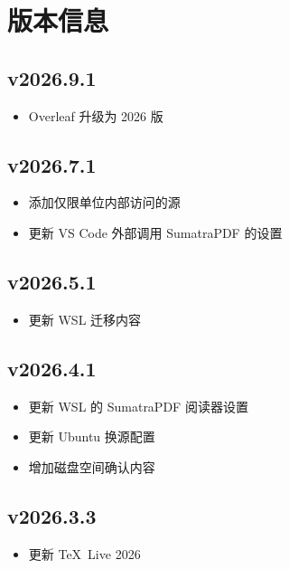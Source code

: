 
\twocolumn

\chapter{版本信息}

\section*{v2026.9.1}

\begin{itemize}
  \item Overleaf 升级为 2026 版
\end{itemize}

\section*{v2026.7.1}

\begin{itemize}
  \item 添加仅限单位内部访问的源
  \item 更新 VS Code 外部调用 SumatraPDF 的设置
\end{itemize}

\section*{v2026.5.1}

\begin{itemize}
  \item 更新 WSL 迁移内容
\end{itemize}

\section*{v2026.4.1}

\begin{itemize}
  \item 更新 WSL 的 SumatraPDF 阅读器设置
  \item 更新 Ubuntu 换源配置
  \item 增加磁盘空间确认内容
\end{itemize}

\section*{v2026.3.3}

\begin{itemize}
  \item 更新 \TeX~Live 2026
\end{itemize}

